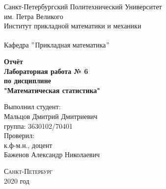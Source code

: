 \documentclass[a4]{article}
\begin{document}



\def\contentsname{\LARGE{Содержание}}
\thispagestyle{empty}
\begin{center} 
	\vspace{2cm} 
	{\Large \sc Санкт-Петербургский Политехнический Университет}\\
	\vspace{2mm}
	{\Large\sc им. Петра Великого}\\
	\vspace{1cm}
	{\large \sc Институт прикладной математики и механики\\ 
		\vspace{0.5mm}
		\textsc{}}\\ 
	\vspace{0.5mm}
	{\large\sc Кафедра $"$Прикладная математика$"$}\\
	\vspace{15mm}
	
	
	{\sc \textbf{Отчёт\\
			Лабораторная работа № 6\\
			по дисциплине\\
			"Математическая статистика"}
		\vspace{6mm}
		
	}
	\vspace*{2mm}
	
	
	\begin{flushleft}
		\vspace{4cm}
		\sc Выполнил студент:\\
		\sc Мальцов Дмитрий Дмитриевич\\
		\sc группа: 3630102/70401\\
		\vspace{1cm}
		\sc Проверил:\\
		\sc к.ф-м.н., доцент\\
		\sc Баженов Александр Николаевич
		\vspace{20mm}
	\end{flushleft}
\end{center} 
\begin{center}
	\vfill {\large\textsc{Санкт-Петербург}}\\ 
	2020 год
\end{center}

\end{document}
